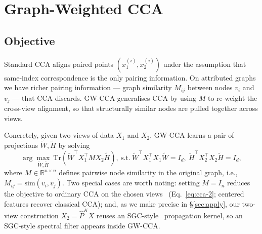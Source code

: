 \documentclass{article}
\begin{document}
\section{Graph-Weighted CCA}
\label{sec:approach}

\subsection{Objective}
\label{sec:approach:objective}

Standard CCA aligns paired points $(x_1^{(i)}, x_2^{(i)})$ under the
assumption that same-index correspondence is the only pairing information.
On attributed graphs we have richer pairing information --- graph similarity
$M_{ij}$ between nodes $v_i$ and $v_j$ --- that CCA discards. GW-CCA
generalises CCA by using $M$ to re-weight the cross-view alignment, so that
structurally similar nodes are pulled together across views.

Concretely, given two views of data $X_1$ and $X_2$, GW-CCA learns a pair of
projections $\widetilde{W}, \widetilde{H}$ by solving
\begin{equation}\label{eq:gcca}
\arg\max_{\widetilde{W}, \widetilde{H}}\ \mathrm{Tr}(\widetilde{W}^\top X_1^\top M X_2 \widetilde{H}),\
\text{s.t.}\ \widetilde{W}^\top X_1^\top X_1 \widetilde{W} = I_d,\ \widetilde{H}^\top X_2^\top X_2 \widetilde{H} = I_d,
\end{equation}
where $M \in \mathbb{R}^{n\times n}$ defines pairwise node similarity in the
original graph, i.e., $M_{ij} = \mathrm{sim}(v_i, v_j)$. Two special cases
are worth noting: setting $M = I_n$ reduces the objective to ordinary
CCA on the chosen views~\citep{hotelling1992relations}
(Eq.~\ref{eq:cca-2}; centered features recover classical CCA); and, as we make
precise in \S\ref{sec:apply}, our two-view construction
$X_2 = \widehat{P}^K X$ reuses an SGC-style~\citep{wu2019simplifying}
propagation kernel, so an SGC-style spectral filter appears inside GW-CCA.
\end{document}
